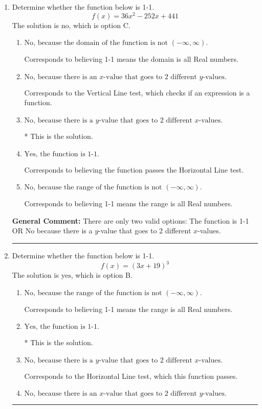 \documentclass{extbook}[14pt]
\newcommand{\litem}[1]{\item #1

\rule{\textwidth}{0.4pt}}
\begin{document}
\begin{enumerate}\litem{
Determine whether the function below is 1-1.
\[ f(x) = 36 x^2 - 252 x + 441 \]The solution is \( \text{no} \), which is option C.\begin{enumerate}[label=\Alph*.]
\item \( \text{No, because the domain of the function is not $(-\infty, \infty)$.} \)

Corresponds to believing 1-1 means the domain is all Real numbers.
\item \( \text{No, because there is an $x$-value that goes to 2 different $y$-values.} \)

Corresponds to the Vertical Line test, which checks if an expression is a function.
\item \( \text{No, because there is a $y$-value that goes to 2 different $x$-values.} \)

* This is the solution.
\item \( \text{Yes, the function is 1-1.} \)

Corresponds to believing the function passes the Horizontal Line test.
\item \( \text{No, because the range of the function is not $(-\infty, \infty)$.} \)

Corresponds to believing 1-1 means the range is all Real numbers.
\end{enumerate}

\textbf{General Comment:} There are only two valid options: The function is 1-1 OR No because there is a $y$-value that goes to 2 different $x$-values.
}
\litem{
Determine whether the function below is 1-1.
\[ f(x) = (3 x + 19)^3 \]The solution is \( \text{yes} \), which is option B.\begin{enumerate}[label=\Alph*.]
\item \( \text{No, because the range of the function is not $(-\infty, \infty)$.} \)

Corresponds to believing 1-1 means the range is all Real numbers.
\item \( \text{Yes, the function is 1-1.} \)

* This is the solution.
\item \( \text{No, because there is a $y$-value that goes to 2 different $x$-values.} \)

Corresponds to the Horizontal Line test, which this function passes.
\item \( \text{No, because there is an $x$-value that goes to 2 different $y$-values.} \)


\end{enumerate}}
\end{enumerate}
\end{document}
